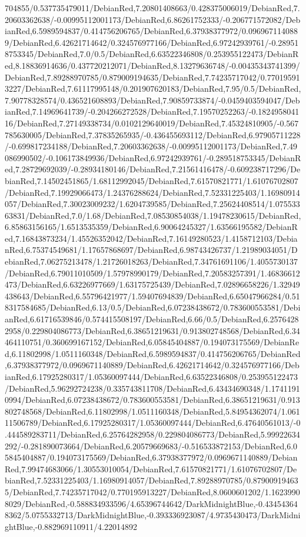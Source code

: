 {\begin{tikzternal}
704855/0.537735479011/DebianRed,7.20801408663/0.428375006019/DebianRed,7.20603362638/-0.00995112001173/DebianRed,6.86261752333/-0.206771572082/DebianRed,6.5989594837/0.414756206765/DebianRed,6.37938377972/0.0969671140889/DebianRed,6.42621714642/0.324576977166/DebianRed,6.97242939761/-0.289518753345/DebianRed,7.0/0.5/DebianRed,6.63522346808/0.253955122473/DebianRed,8.18836914636/0.437720212071/DebianRed,8.13279636748/-0.00435343741399/DebianRed,7.89288970785/0.879009194635/DebianRed,7.74235717042/0.770195913227/DebianRed,7.61117995148/0.201907620183/DebianRed,7.95/0.5/DebianRed,7.90778328574/0.436521608893/DebianRed,7.90859733874/-0.0459403594047/DebianRed,7.14969641739/-0.204266272528/DebianRed,7.19570252263/-0.182495804116/DebianRed,7.27149338734/0.0102129640019/DebianRed,7.45324810905/-0.567785630005/DebianRed,7.37835265935/-0.436455693112/DebianRed,6.97905711228/-0.699817234188/DebianRed,7.20603362638/-0.00995112001173/DebianRed,7.49086990502/-0.106173849936/DebianRed,6.97242939761/-0.289518753345/DebianRed,7.28729692039/-0.28934180146/DebianRed,7.21561416478/-0.609238717296/DebianRed,7.14502451865/1.68112992045/DebianRed,7.61570821771/1.61076702807/DebianRed,7.19929066473/1.24376288624/DebianRed,7.52331225403/1.16980914057/DebianRed,7.30023009232/1.6204739585/DebianRed,7.25624408514/1.07553363831/DebianRed,7.0/1.68/DebianRed,7.08530854038/1.19478230615/DebianRed,6.85863156165/1.6513535359/DebianRed,6.90064245327/1.63566195582/DebianRed,7.16843873234/1.45526352042/DebianRed,7.16149280523/1.4158712103/DebianRed,6.75374549681/1.17657868697/DebianRed,6.98743426737/1.21989034051/DebianRed,7.06275213478/1.21726018263/DebianRed,7.34761691106/1.4055730137/DebianRed,6.79011010509/1.57978990179/DebianRed,7.20583257391/1.46836612473/DebianRed,6.63226977669/1.63175725439/DebianRed,7.02896658226/1.32949438643/DebianRed,6.55796421977/1.59407694839/DebianRed,6.65047966284/0.518317584685/DebianRed,6.13/0.5/DebianRed,6.07238438672/0.783600553581/DebianRed,6.61716539846/0.574415508197/DebianRed,6.66/0.5/DebianRed,6.25764282958/0.229804086773/DebianRed,6.38651219631/0.913802748568/DebianRed,6.34464110751/0.360699167152/DebianRed,6.05845404887/0.194073175569/DebianRed,6.11802998/1.0511160348/DebianRed,6.5989594837/0.414756206765/DebianRed,6.37938377972/0.0969671140889/DebianRed,6.42621714642/0.324576977166/DebianRed,6.17925280317/1.05360097444/DebianRed,6.63522346808/0.253955122473/DebianRed,5.96292724238/0.335743811708/DebianRed,6.43434690348/1.17411910994/DebianRed,6.07238438672/0.783600553581/DebianRed,6.38651219631/0.913802748568/DebianRed,6.11802998/1.0511160348/DebianRed,5.84954362074/1.06111506789/DebianRed,6.17925280317/1.05360097444/DebianRed,6.47640561013/-0.444589283711/DebianRed,6.25764282958/0.229804086773/DebianRed,5.99922634292/-0.281890073664/DebianRed,6.20579669683/-0.516533872153/DebianRed,6.05845404887/0.194073175569/DebianRed,6.37938377972/0.0969671140889/DebianRed,7.99474683066/1.30553010054/DebianRed,7.61570821771/1.61076702807/DebianRed,7.52331225403/1.16980914057/DebianRed,7.89288970785/0.879009194635/DebianRed,7.74235717042/0.770195913227/DebianRed,8.0600601202/1.16239908029/DebianRed,-0.588834933596/4.65396744642/DarkMidnightBlue,-0.434543648362/5.0755332713/DarkMidnightBlue,-0.393336923087/4.9735430473/DarkMidnightBlue,-0.882969110911/4.22014892
\end{tikzternal}}
